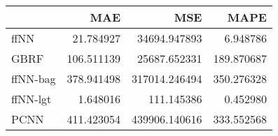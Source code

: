 \begin{tabular}{lrrr}
\toprule
{} &         MAE &            MSE &        MAPE \\
\midrule
ffNN     &   21.784927 &   34694.947893 &    6.948786 \\
GBRF     &  106.511139 &   25687.652331 &  189.870687 \\
ffNN-bag &  378.941498 &  317014.246494 &  350.276328 \\
ffNN-lgt &    1.648016 &     111.145386 &    0.452980 \\
PCNN     &  411.423054 &  439906.140616 &  333.552568 \\
\bottomrule
\end{tabular}
